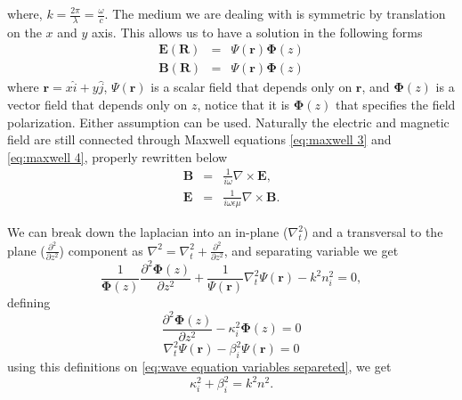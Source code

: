 \documentclass[12pt,twoside,english]{book}
\renewcommand{\~}{\perispomeni}%
\numberwithin{equation}{section}
\numberwithin{figure}{section}
\begin{document}
where, $k=\frac{2\pi}{\lambda}=\frac{\omega}{c}$. The medium we are dealing with is symmetric by translation on the $x$ and $y$ axis. This allows us to have a solution in the following forms
\begin{eqnarray}
\mathbf{E}\left(\mathbf{R}\right) & = & \Psi\left(\mathbf{r}\right)\mathbf{\Phi}\left(z\right)\label{eq:assumption E}\\
\mathbf{B}\left(\mathbf{R}\right) & = & \Psi\left(\mathbf{r}\right)\mathbf{\Phi}\left(z\right)\label{eq:assumption B}\end{eqnarray}
where $\mathbf{r}=x\hat{i}+y\hat{j}$, $\Psi\left(\mathbf{r}\right)$ is a scalar field that depends only on $\mathbf{r}$, and $\mathbf{\Phi}\left(z\right)$ is a vector field that depends only on $z$, notice that it is $\mathbf{\Phi}\left(z\right)$ that specifies the field polarization. Either assumption can be used. Naturally the electric and magnetic field are still connected through Maxwell equations \ref{eq:maxwell 3} and \ref{eq:maxwell 4}, properly rewritten below
\begin{subequations}\begin{eqnarray}
\mathbf{B} & = & \frac{1}{i\omega}\nabla\times\mathbf{E},\\
\mathbf{E} & = & \frac{1}{i\omega\epsilon\mu}\nabla\times\mathbf{B}.
\end{eqnarray}\end{subequations}

We can break down the laplacian into an in-plane ($\nabla_{t}^{2}$) and a transversal to the plane ($\frac{\partial^{2}}{\partial z^{2}}$) component as $\nabla^{2}=\nabla_{t}^{2}+\frac{\partial^{2}}{\partial z^{2}}$, and separating variable we get
\begin{equation}
\frac{1}{\mathbf{\Phi}\left(z\right)}\frac{\partial^{2}\mathbf{\Phi}\left(z\right)}{\partial z^{2}}+\frac{1}{\Psi\left(\mathbf{r}\right)}\nabla_{t}^{2}\Psi\left(\mathbf{r}\right)-k^{2}n_i^{2}=0,
\label{eq:wave equation variables separeted}\end{equation}
defining
\begin{equation}
\frac{\partial^{2}\mathbf{\Phi}\left(z\right)}{\partial z^{2}}-\kappa_i^{2}\mathbf{\Phi}\left(z\right)=0\label{eq:out plane wave equation}\end{equation}
\begin{equation}
\nabla_{t}^{2}\Psi\left(\mathbf{r}\right)-\beta_i^{2}\Psi\left(\mathbf{r}\right)=0\label{eq:in plane wave equation}\end{equation}
using this definitions on \ref{eq:wave equation variables separeted}, we get
\begin{equation}
\kappa_i^{2}+\beta_i^{2}=k^{2}n^{2}.
\label{eq:kappa beta wavenumber relation}
\end{equation}
\end{document}
